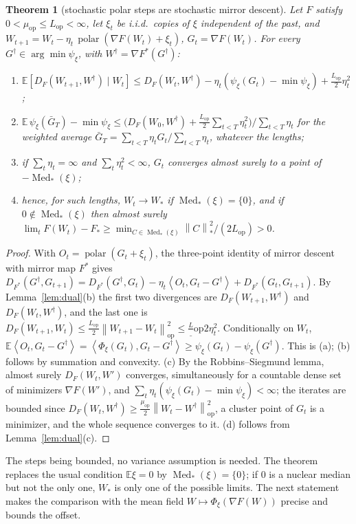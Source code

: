 \documentclass[11pt]{article}
\newtheorem{theorem}{Theorem}
\theoremstyle{remark}
\newcommand{\E}{\mathbb{E}}
\newcommand{\nop}[1]{\left\|#1\right\|_{\mathrm{op}}}
\newcommand{\nnuc}[1]{\left\|#1\right\|_{*}}
\newcommand{\inner}[2]{\left\langle #1, #2 \right\rangle}
\newcommand{\polar}{\operatorname{polar}}
\newcommand{\Med}{\operatorname{Med}_\ast}
\newcommand{\Lop}{L_{\mathrm{op}}}
\newcommand{\muop}{\mu_{\mathrm{op}}}
\begin{document}
\begin{theorem}[stochastic polar steps are stochastic mirror descent]\label{thm:smd}
Let $F$ satisfy $0<\muop\le\Lop<\infty$, let $\xi_t$ be i.i.d.\ copies of $\xi$ independent of the past, and
$W_{t+1}=W_t-\eta_t\,\polar(\nabla F(W_t)+\xi_t)$, $G_t=\nabla F(W_t)$. For every $G^\dagger\in\arg\min\psi_\xi$, with
$W^\dagger=\nabla F^\ast(G^\dagger)$:
\begin{enumerate}[label=(\alph*),itemsep=1pt,topsep=2pt]
\item $\E[D_F(W_{t+1},W^\dagger)\mid W_t]\le D_F(W_t,W^\dagger)-\eta_t(\psi_\xi(G_t)-\min\psi_\xi)+\frac{\Lop}2\eta_t^2$;
\item $\E\,\psi_\xi(\bar G_T)-\min\psi_\xi\le\big(D_F(W_0,W^\dagger)+\frac{\Lop}2\sum_{t<T}\eta_t^2\big)/\sum_{t<T}\eta_t$ for
the weighted average $\bar G_T=\sum_{t<T}\eta_tG_t/\sum_{t<T}\eta_t$, whatever the lengths;
\item if $\sum_t\eta_t=\infty$ and $\sum_t\eta_t^2<\infty$, $G_t$ converges almost surely to a point of $-\Med(\xi)$;
\item hence, for such lengths, $W_t\to W_\ast$ if $\Med(\xi)=\{0\}$, and if $0\notin\Med(\xi)$ then almost surely
$\lim_tF(W_t)-F_\ast\ge\min_{C\in\Med(\xi)}\nnuc C^2/(2\Lop)>0$.
\end{enumerate}
\end{theorem}
\begin{proof}
With $O_t=\polar(G_t+\xi_t)$, the three-point identity of mirror descent with mirror map $F^\ast$ gives
$D_{F^\ast}(G^\dagger,G_{t+1})=D_{F^\ast}(G^\dagger,G_t)-\eta_t\inner{O_t}{G_t-G^\dagger}+D_{F^\ast}(G_t,G_{t+1})$. By
Lemma~\ref{lem:dual}(b) the first two divergences are $D_F(W_{t+1},W^\dagger)$ and $D_F(W_t,W^\dagger)$, and the last one
is $D_F(W_{t+1},W_t)\le\frac{\Lop}2\nop{W_{t+1}-W_t}^2\le\frac\Lop2\eta_t^2$. Conditionally on $W_t$,
$\E\inner{O_t}{G_t-G^\dagger}=\inner{\Phi_\xi(G_t)}{G_t-G^\dagger}\ge\psi_\xi(G_t)-\psi_\xi(G^\dagger)$. This is (a); (b)
follows by summation and convexity. (c) By the Robbins--Siegmund lemma, almost surely $D_F(W_t,W')$ converges,
simultaneously for a countable dense set of minimizers $\nabla F(W')$, and
$\sum_t\eta_t(\psi_\xi(G_t)-\min\psi_\xi)<\infty$; the iterates are bounded since
$D_F(W_t,W^\dagger)\ge\frac{\muop}2\nop{W_t-W^\dagger}^2$, a cluster point of $G_t$ is a minimizer, and the whole
sequence converges to it. (d) follows from Lemma~\ref{lem:dual}(c).
\end{proof}

The steps being bounded, no variance assumption is needed. The theorem replaces the usual condition $\E\xi=0$ by
$\Med(\xi)=\{0\}$; if $0$ is a nuclear median but not the only one, $W_\ast$ is only one of the possible limits. The
next statement makes the comparison with the mean field $W\mapsto\Phi_\xi(\nabla F(W))$ precise and bounds the offset.
\end{document}
